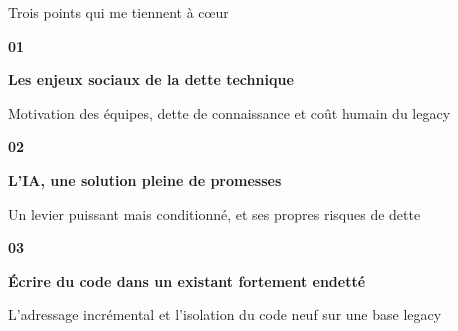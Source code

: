\newcommand{\planitem}[3]{%
  \noindent
  \begin{minipage}[c]{1.85cm}%
    {\seriffont\bfseries\fontsize{38}{38}\selectfont\color{accent}#1}%
  \end{minipage}%
  \begin{minipage}[c]{\dimexpr\textwidth-1.95cm\relax}%
    {\seriffont\bfseries\fontsize{16}{20}\selectfont\color{ink}#2\par}%
    \vspace{2pt}%
    {\fontsize{10.5}{14}\selectfont\color{ink2}#3\par}%
  \end{minipage}\par}

\begin{frame}{Trois points qui me tiennent à cœur}
  \vspace{0.30cm}
  \planitem{01}{Les enjeux sociaux de la dette technique}%
    {Motivation des équipes, dette de connaissance et coût humain du legacy}

  \vspace{0.28cm}{\color{rule}\rule{\textwidth}{0.6pt}}\par\vspace{0.28cm}

  \planitem{02}{L'IA, une solution pleine de promesses}%
    {Un levier puissant mais conditionné, et ses propres risques de dette}

  \vspace{0.28cm}{\color{rule}\rule{\textwidth}{0.6pt}}\par\vspace{0.28cm}

  \planitem{03}{Écrire du code dans un existant fortement endetté}%
    {L'adressage incrémental et l'isolation du code neuf sur une base legacy}
\end{frame}
